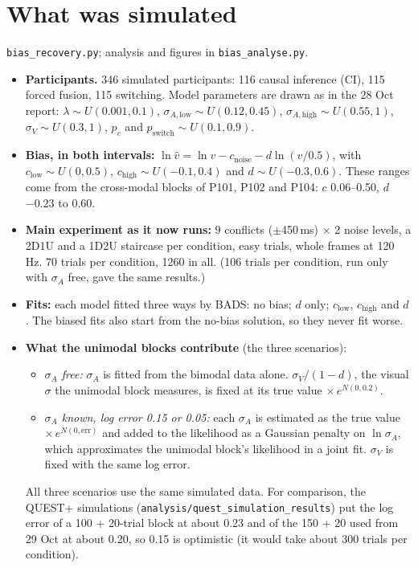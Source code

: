 \documentclass[11pt,a4paper]{article}
\newcommand{\pc}{p_c}
\begin{document}
\section{What was simulated}\label{sec:sim}
\texttt{bias\_recovery.py}; analysis and figures in \texttt{bias\_analyse.py}.
\begin{itemize}
\item \textbf{Participants.} 346 simulated participants: 116 causal inference (CI), 115 forced fusion, 115 switching. Model parameters are drawn as in the 28 Oct report: $\lambda \sim U(0.001, 0.1)$, $\sigma_{A,\text{low}} \sim U(0.12, 0.45)$, $\sigma_{A,\text{high}} \sim U(0.55, 1)$, $\sigma_V \sim U(0.3, 1)$, $\pc$ and $p_\text{switch} \sim U(0.1, 0.9)$.
\item \textbf{Bias, in both intervals:} $\ln \hat v = \ln v - c_\text{noise} - d \ln(v / 0.5)$, with $c_\text{low} \sim U(0, 0.5)$, $c_\text{high} \sim U(-0.1, 0.4)$ and $d \sim U(-0.3, 0.6)$. These ranges come from the cross-modal blocks of P101, P102 and P104: $c$ 0.06--0.50, $d$ $-0.23$ to 0.60.
\item \textbf{Main experiment as it now runs:} 9 conflicts ($\pm$450\,ms) $\times$ 2 noise levels, a 2D1U and a 1D2U staircase per condition, easy trials, whole frames at 120\,Hz. 70 trials per condition, 1260 in all. (106 trials per condition, run only with $\sigma_A$ free, gave the same results.)
\item \textbf{Fits:} each model fitted three ways by BADS: no bias; $d$ only; $c_\text{low}$, $c_\text{high}$ and $d$. The biased fits also start from the no-bias solution, so they never fit worse.
\item \textbf{What the unimodal blocks contribute} (the three scenarios):
  \begin{itemize}
  \item \emph{$\sigma_A$ free:} $\sigma_A$ is fitted from the bimodal data alone. $\sigma_V/(1-d)$, the visual $\sigma$ the unimodal block measures, is fixed at its true value $\times\, e^{N(0, 0.2)}$.
  \item \emph{$\sigma_A$ known, log error 0.15 or 0.05:} each $\sigma_A$ is estimated as the true value $\times\, e^{N(0, \text{err})}$ and added to the likelihood as a Gaussian penalty on $\ln\sigma_A$, which approximates the unimodal block's likelihood in a joint fit. $\sigma_V$ is fixed with the same log error.
  \end{itemize}
  All three scenarios use the same simulated data. For comparison, the QUEST+ simulations (\texttt{analysis/quest\_simulation\_results}) put the log error of a 100 + 20-trial block at about 0.23 and of the 150 + 20 used from 29 Oct at about 0.20, so 0.15 is optimistic (it would take about 300 trials per condition).
\end{itemize}
\end{document}
